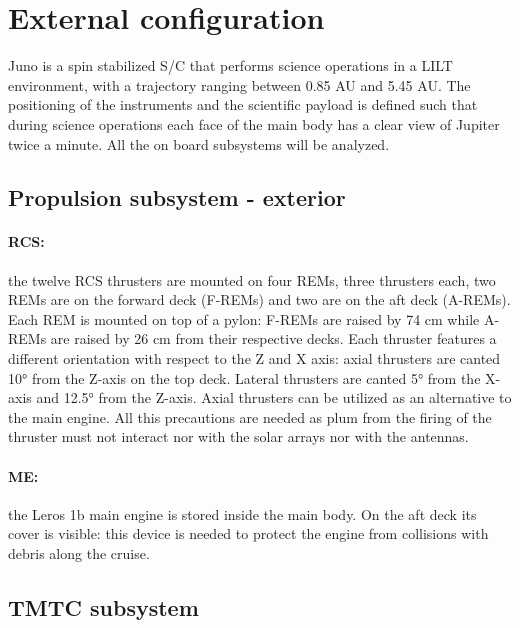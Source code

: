 \section{External configuration}
\label{sec:external_config}

Juno is a spin stabilized S/C that performs science operations in a LILT environment, with a trajectory ranging between 0.85 AU and 5.45 AU. The positioning of the instruments and the scientific payload is defined such that during science operations each face of the main body has a clear view of Jupiter twice a minute. All the on board subsystems will be analyzed. 

\subsection{Propulsion subsystem - exterior}
\label{subsec:prop_sub}

\paragraph{RCS:}the twelve RCS thrusters are mounted on four REMs, three thrusters each, two REMs are on the forward deck (F-REMs) and two are on the aft deck (A-REMs). 
Each REM is mounted on top of a pylon: F-REMs are raised by 74 cm while A-REMs are raised by 26 cm from their respective decks. Each thruster features a different orientation with respect to the Z and X axis: axial thrusters are canted 10° from the Z-axis on the top deck. Lateral thrusters are canted 5° from the X-axis and 12.5° from the Z-axis. Axial thrusters can be utilized as an alternative to the main engine.  
\cite{juno_inner}
All this precautions are needed as plum from the firing of the thruster must not interact nor with the solar arrays nor with the antennas.

\vspace{-4mm}

\paragraph{ME:}the Leros 1b main engine is stored inside the main body. On the aft deck its cover is visible: this device is needed to protect the engine from collisions with debris along the cruise. 

\subsection{TMTC subsystem}
\label{subsec:tmtc_sub}

